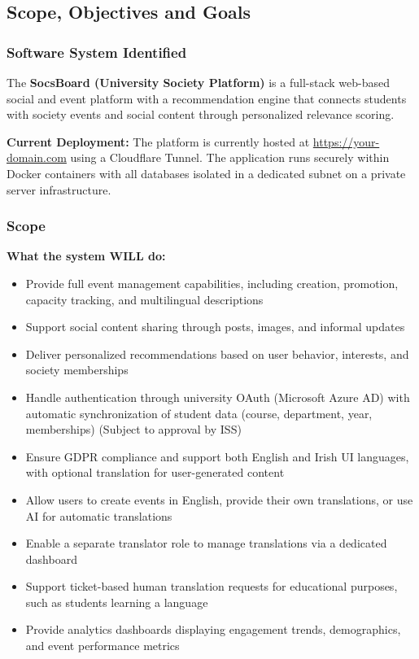 \documentclass[12pt,a4paper]{article}
\begin{document}
\subsection{Scope, Objectives and Goals}

\subsubsection{Software System Identified}

The \textbf{SocsBoard (University Society Platform)} is a full-stack web-based social and event platform with a recommendation engine that connects students with society events and social content through personalized relevance scoring.

\textbf{Current Deployment:} The platform is currently hosted at \url{https://your-domain.com} using a Cloudflare Tunnel. The application runs securely within Docker containers with all databases isolated in a dedicated subnet on a private server infrastructure.

\subsubsection{Scope}

\textbf{What the system WILL do:}
\begin{itemize}
    \item Provide full event management capabilities, including creation, promotion, capacity tracking, and multilingual descriptions
    \item Support social content sharing through posts, images, and informal updates
    \item Deliver personalized recommendations based on user behavior, interests, and society memberships
    \item Handle authentication through university OAuth (Microsoft Azure AD) with automatic synchronization of student data (course, department, year, memberships) (Subject to approval by ISS)
    \item Ensure GDPR compliance and support both English and Irish UI languages, with optional translation for user-generated content
    \item Allow users to create events in English, provide their own translations, or use AI for automatic translations
    \item Enable a separate translator role to manage translations via a dedicated dashboard
    \item Support ticket-based human translation requests for educational purposes, such as students learning a language
    \item Provide analytics dashboards displaying engagement trends, demographics, and event performance metrics
\end{itemize}
\end{document}
